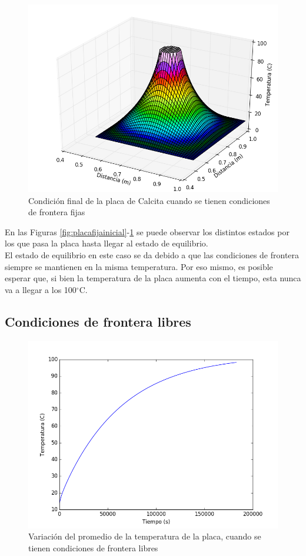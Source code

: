 \documentclass[]{article}
\begin{document}
\begin{figure}[H]
    \centering
    \includegraphics[width=\linewidth]{placafijafinal.png}
    \caption{Condición final de la placa de Calcita cuando se tienen condiciones de frontera fijas}
    \label{fig:placafijafinal}
\end{figure}

En las Figuras \ref{fig:placafijainicial}-\ref{fig:placafijafinal} se puede observar los distintos estados por los que pasa la placa hasta llegar al estado de equilibrio.\\
El estado de equilibrio en este caso se da debido a que las condiciones de frontera siempre se mantienen en la misma temperatura. Por eso mismo, es posible esperar que, si bien la temperatura de la placa aumenta con el tiempo, esta nunca va a llegar a los 100$^\circ$C.

\subsection{Condiciones de frontera libres}

\begin{figure}[H]
    \centering
    \includegraphics[width=\linewidth]{promediolibre.png}
    \caption{Variación del promedio de la temperatura de la placa, cuando se tienen condiciones de frontera libres}
    \label{fig:promediolibre}
\end{figure}
\end{document}
